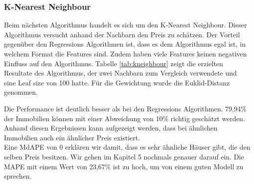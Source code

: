 \subsubsection{K-Nearest Neighbour}
Beim nächsten Algorithmus handelt es sich um den K-Nearest Neighbour. Dieser Algorithmus versucht anhand der Nachbarn den Preis zu schätzen. Der Vorteil gegenüber den Regressions Algorithmen ist, dass es dem Algorithmus egal ist, in welchem Format die Features sind. Zudem haben viele Features keinen negativen Einfluss auf den Algorithmus.
Tabelle \ref{tab:kneighbour} zeigt die erzielten Resultate des Algorithmus, der zwei Nachbarn zum Vergleich verwendete und eine Leaf size von 100 hatte. Für die Gewichtung wurde die Euklid-Distanz genommen.\\[2ex]
%
\begin{table}[ht]
\centering
{}
\caption{Ergebnisse vom K-Nearest Neighbour}
\label{tab:regression}
\end{table}
%
Die Performance ist deutlich besser als bei den Regressions Algorithmen. 79,94\% der Immobilien können mit einer Abweichung von 10\% richtig geschätzt werden. Anhand diesen Ergebnissen kann aufgezeigt werden, dass bei ähnlichen Immobilien auch ein ähnlicher Preis existiert.\\
Eine MdAPE von 0 erklären wir damit, dass es sehr ähnliche Häuser gibt, die den selben Preis besitzen. Wir gehen im Kapitel 5 nochmals genauer darauf ein. Die MAPE mit einem Wert von 23,67\% ist zu hoch, um von einem guten Modell zu sprechen.\\[2ex]
%
